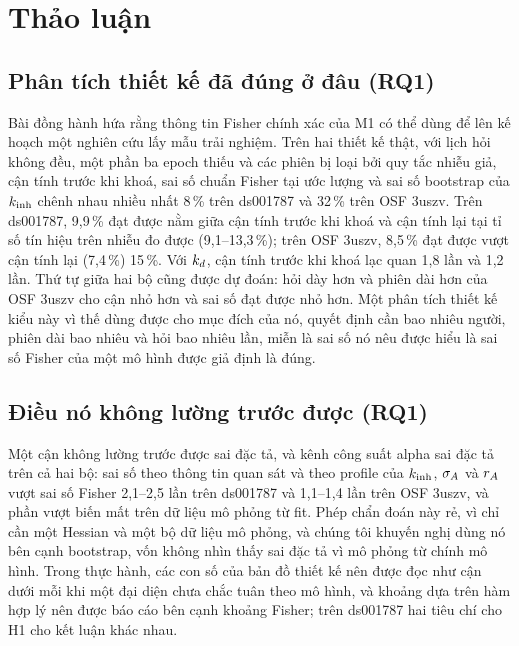 \section{Thảo luận}
\label{sec:discussion}

\subsection{Phân tích thiết kế đã đúng ở đâu (RQ1)}
Bài đồng hành hứa rằng thông tin Fisher chính xác của M1 có thể dùng để lên kế hoạch một nghiên cứu lấy mẫu trải nghiệm. Trên hai thiết kế thật, với lịch hỏi không đều, một phần ba epoch thiếu và các phiên bị loại bởi quy tắc nhiễu giả, cận tính trước khi khoá, sai số chuẩn Fisher tại ước lượng và sai số bootstrap của $k_{\mathrm{inh}}$ chênh nhau nhiều nhất 8\,\% trên ds001787 và 32\,\% trên OSF 3uszv. Trên ds001787, 9,9\,\% đạt được nằm giữa cận tính trước khi khoá và cận tính lại tại tỉ số tín hiệu trên nhiễu đo được (9,1--13,3\,\%); trên OSF 3uszv, 8,5\,\% đạt được vượt cận tính lại (7,4\,\%) 15\,\%. Với $k_{d}$, cận tính trước khi khoá lạc quan 1,8 lần và 1,2 lần. Thứ tự giữa hai bộ cũng được dự đoán: hỏi dày hơn và phiên dài hơn của OSF 3uszv cho cận nhỏ hơn và sai số đạt được nhỏ hơn. Một phân tích thiết kế kiểu này vì thế dùng được cho mục đích của nó, quyết định cần bao nhiêu người, phiên dài bao nhiêu và hỏi bao nhiêu lần, miễn là sai số nó nêu được hiểu là sai số Fisher của một mô hình được giả định là đúng.

\subsection{Điều nó không lường trước được (RQ1)}
Một cận không lường trước được sai đặc tả, và kênh công suất alpha sai đặc tả trên cả hai bộ: sai số theo thông tin quan sát và theo profile của $k_{\mathrm{inh}}$, $\sigma_{A}$ và $r_{A}$ vượt sai số Fisher 2,1--2,5 lần trên ds001787 và 1,1--1,4 lần trên OSF 3uszv, và phần vượt biến mất trên dữ liệu mô phỏng từ fit. Phép chẩn đoán này rẻ, vì chỉ cần một Hessian và một bộ dữ liệu mô phỏng, và chúng tôi khuyến nghị dùng nó bên cạnh bootstrap, vốn không nhìn thấy sai đặc tả vì mô phỏng từ chính mô hình. Trong thực hành, các con số của bản đồ thiết kế nên được đọc như cận dưới mỗi khi một đại diện chưa chắc tuân theo mô hình, và khoảng dựa trên hàm hợp lý nên được báo cáo bên cạnh khoảng Fisher; trên ds001787 hai tiêu chí cho H1 cho kết luận khác nhau.

